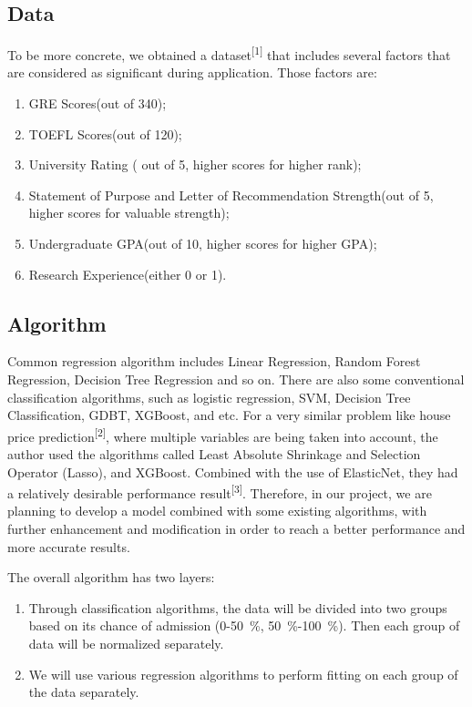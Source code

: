 \documentclass{article}
\begin{document}
\subsection{Data}
To be more concrete, we obtained a dataset\textsuperscript{[1]} that includes several factors that are considered as significant during application. Those factors are:

\begin{enumerate}[1.]
	\item GRE Scores(out of 340);
	\item TOEFL Scores(out of 120);
	\item University Rating ( out of 5, higher scores for higher rank);
	\item Statement of Purpose and Letter of Recommendation Strength(out of 5, higher scores for valuable strength); 
	\item Undergraduate GPA(out of 10, higher scores for higher GPA);  
	\item Research Experience(either 0 or 1). 
\end{enumerate}

\subsection{Algorithm}
Common regression algorithm includes Linear Regression, Random Forest Regression, Decision Tree Regression and so on. There are also some conventional classification algorithms, such as logistic regression, SVM, Decision Tree Classification, GDBT, XGBoost, and etc. For a very similar problem like house price prediction\textsuperscript{[2]}, where multiple variables are being taken into account, the author used the algorithms called Least Absolute Shrinkage and Selection Operator (Lasso), and XGBoost. Combined with the use of ElasticNet, they had a relatively desirable performance result\textsuperscript{[3]}. Therefore, in our project, we are planning to develop a model combined with some existing algorithms, with further enhancement and modification in order to reach a better performance and more accurate results.

	The overall algorithm has two layers:
	\begin{enumerate}[1.]
	\item Through classification algorithms, the data will be divided into two groups based on its chance of admission (0-50\ \%, 50\ \%-100\ \%). Then each group of data will be normalized separately.
	\item We will use various regression algorithms to perform fitting on each group of the data separately. 
	\end{enumerate}
	
\end{document}
